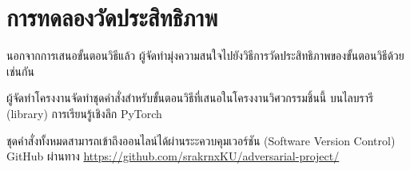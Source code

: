 \section{การทดลองวัดประสิทธิภาพ}

นอกจากการเสนอขั้นตอนวิธีแล้ว ผู้จัดทำมุ่งความสนใจไปยังวิธีการวัดประสิทธิภาพของขั้นตอนวิธีด้วยเช่นกัน

ผู้จัดทำโครงงานจัดทำชุดคำสั่งสำหรับขั้นตอนวิธีที่เสนอในโครงงานวิศวกรรมชิ้นนี้ บนไลบรารี (library) การเรียนรู้เชิงลึก PyTorch \cite{PyTorch2019}

ชุดคำสั่งทั้งหมดสามารถเข้าถึงออนไลน์ได้ผ่านระะควบคุมเวอร์ชัน (Software Version Control) GitHub ผ่านทาง \url{https://github.com/srakrnxKU/adversarial-project/}
